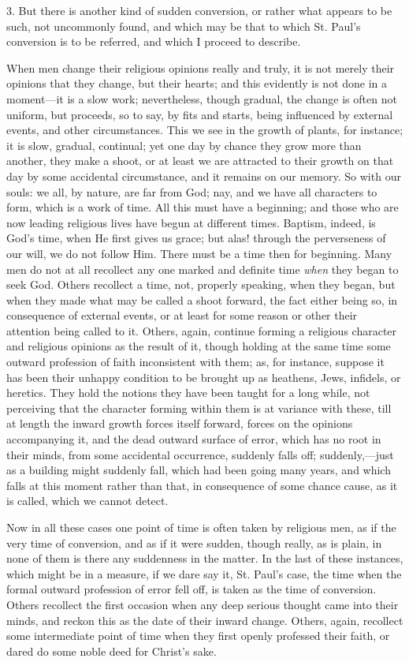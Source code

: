 3. But there is another kind of sudden conversion, or rather what
appears to be such, not uncommonly found, and which may be that to
which St. Paul's conversion is to be referred, and which I proceed to
describe.

When men change their religious opinions really and truly, it is
not merely their opinions that they change, but their hearts; and this
evidently is not done in a moment—it is a slow work; nevertheless,
though gradual, the change is often not uniform, but proceeds, so to
say, by fits and starts, being influenced by external events, and
other circumstances. This we see in the growth of plants, for
instance; it is slow, gradual, continual; yet one day by chance they
grow more than another, they make a shoot, or at least we are
attracted to their growth on that day by some accidental circumstance,
and it remains on our memory. So with our souls: we all, by nature,
are far from God; nay, and we have all characters to form, which is a
work of time. All this must have a beginning; and those who are now
leading religious lives have begun at different times. Baptism,
indeed, is God's time, when He first gives us grace; but alas! through
the perverseness of our will, we do not follow Him. There must be a
time then for beginning. Many men do not at all recollect any one
marked and definite time \emph{when} they began to seek God. Others
recollect a time, not, properly speaking, when they began, but when
they made what may be called a shoot forward, the fact either being
so, in consequence of external events, or at least for some reason or
other their attention being called to it. Others, again, continue
forming a religious character and religious opinions as the result of
it, though holding at the same time some outward profession of faith
inconsistent with them; as, for instance, suppose it has been their
unhappy condition to be brought up as heathens, Jews, infidels, or
heretics. They hold the notions they have been taught for a long
while, not perceiving that the character forming within them is at
variance with these, till at length the inward growth forces itself
forward, forces on the opinions accompanying it, and the dead outward
surface of error, which has no root in their minds, from some
accidental occurrence, suddenly falls off; suddenly,—just as a
building might suddenly fall, which had been going many years, and
which falls at this moment rather than that, in consequence of some
chance cause, as it is called, which we cannot detect.

Now in all these cases one point of time is often taken by
religious men, as if the very time of conversion, and as if it were
sudden, though really, as is plain, in none of them is there any
suddenness in the matter. In the last of these instances, which might
be in a measure, if we dare say it, St. Paul's case, the time when the
formal outward profession of error fell off, is taken as the time of
conversion. Others recollect the first occasion when any deep serious
thought came into their minds, and reckon this as the date of their
inward change. Others, again, recollect some intermediate point of
time when they first openly professed their faith, or dared do some
noble deed for Christ's sake.

